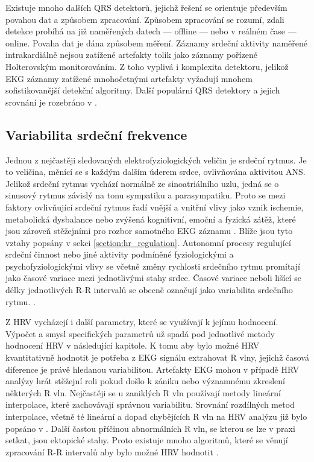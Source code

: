 Existuje mnoho dalších QRS detektorů, jejichž řešení se orientuje především
povahou dat a způsobem zpracování. Způsobem zpracování se rozumí, zdali detekce
probíhá na již naměřených datech --- offline --- nebo v reálném čase --- online.
Povaha dat je dána způsobem měření. Záznamy srdeční aktivity naměřené
intrakardiálně nejsou zatížené artefakty tolik jako záznamy pořízené
Holterovským monitorováním. Z toho vyplivá i komplexita detektoru, jelikož EKG
záznamy zatížené mnohočetnými artefakty vyžadují mnohem sofistikovanější
detekční algoritmy. Další populární QRS detektory a jejich srovnání je rozebráno
v \cite{Kohler2002,Canento2012,Vaneghi2012,Alvarez2013,Karpagachelvi2010}.


\subsection{Variabilita srdeční frekvence}
\label{section:hrv}
Jednou z nejčastěji sledovaných elektrofyziologických veličin je srdeční rytmus.
Je to veličina, měnící se s každým dalším úderem srdce, ovlivňována aktivitou
ANS. Jelikož srdeční rytmus vychází normálně ze sinoatriálního uzlu, jedná se o
sinusový rytmus závislý na tonu sympatiku a parasympatiku. Proto se mezi
faktory ovlivňující srdeční rytmus řadí vnější a vnitřní vlivy jako vznik
ischemie, metabolická dysbalance nebo zvýšená kognitivní, emoční a fyzická
zátěž, které jsou zároveň stěžejními pro rozbor samotného EKG záznamu
\cite{Pumprla2014}. Blíže jsou tyto vztahy popsány v sekci
\ref{section:hr_regulation}. Autonomní procesy regulující srdeční činnost nebo
jiné aktivity podmíněné fyziologickými a psychofyziologickými vlivy se včetně
změny rychlosti srdečního rytmu promítají jako časové variace mezi jednotlivými
stahy srdce. Časové variace neboli lišící se délky jednotlivých R-R intervalů se
obecně označují jako variabilita srdečního rytmu.
\cite{Pumprla2014,Rajendra2007}.

Z HRV vycházejí i další parametry, které se využívají k jejímu hodnocení.
Výpočet a smysl specifických parametrů už spadá pod jednotlivé metody hodnocení
HRV v následující kapitole. K tomu aby bylo možné HRV kvantitativně hodnotit je
potřeba z EKG signálu extrahovat R vlny, jejichž časová diference je právě
hledanou variabilitou. Artefakty EKG mohou v případě HRV analýzy hrát stěžejní
roli pokud došlo k zániku nebo významnému zkreslení některých R vln. Nejčastěji
se u zaniklých R vln používají metody lineární interpolace, které zachovávají
správnou variabilitu. Srovnání rozdílných metod interpolace, včetně té lineární
a dopad chybějících R vln na HRV analýzu již bylo popsáno v
\cite{Kim2007,Peltola2012,Morelli2019}. Další častou příčinou abnormálních R
vln, se kterou se lze v praxi setkat, jsou ektopické stahy. Proto existuje mnoho
algoritmů, které se věnují zpracování R-R intervalů aby bylo možné HRV hodnotit
\cite{Lipponen2019}.

